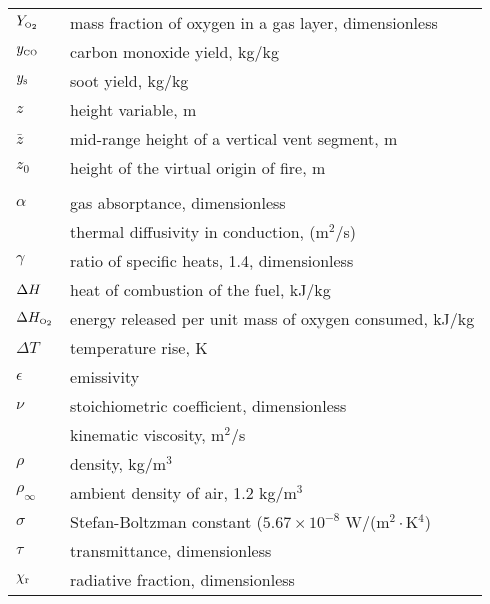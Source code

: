 \documentclass[12pt]{book}
\begin{document}
\begin{center}
\begin{longtable}{p{1in}  p{5.5 in}}
$Y_{\tiny \hbox{O}_2}$           & mass fraction of oxygen in a gas layer, dimensionless \\
$y_{{\tiny \hbox{CO}}}$           & carbon monoxide yield, kg/kg \\
$y_{\rm s}$         & soot yield, kg/kg \\
$z$                 & height variable, m \\
$\bar{z}$           & mid-range height of a vertical vent segment, m \\
$z_0$               & height of the virtual origin of fire, m \\
  \\
$\alpha$            & gas absorptance, dimensionless \\
                    & thermal diffusivity in conduction, (m$^2$/s) \\
$\gamma$            & ratio of specific heats, 1.4, dimensionless \\
$\Delta H$               & heat of combustion of the fuel, kJ/kg \\
$\Delta H_{\tiny \hbox{O}_2}$              & energy released per unit mass of oxygen consumed, kJ/kg \\
$\Delta T$          & temperature rise, K \\
$\epsilon$          & emissivity \\
$\nu$               & stoichiometric coefficient, dimensionless \\
                    & kinematic viscosity, m$^2$/s \\
$\rho$              & density, kg/m$^3$ \\
$\rho_\infty$       & ambient density of air, 1.2 kg/m$^3$ \\
$\sigma$            & Stefan-Boltzman constant ($5.67 \times 10^{-8}$ W/(m$^2\cdot$K$^4$) \\
$\tau$              & transmittance, dimensionless \\
$\chi_{\rm r}$      & radiative fraction, dimensionless \\
\end{longtable}

\end{center}


\end{document}
